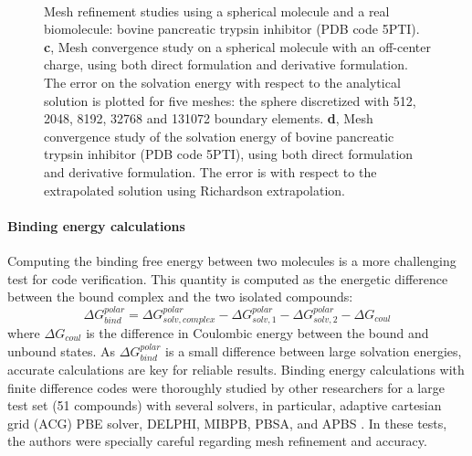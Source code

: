 \begin{figure*}
        \centering
     \quad
     \\
    \caption{Mesh refinement studies using a spherical molecule and a real biomolecule: bovine pancreatic trypsin inhibitor (PDB code 5PTI).
    \textbf{c}, Mesh convergence study on a spherical molecule with an off-center charge, using both direct formulation and derivative formulation. The error on the solvation energy with respect to the analytical solution is plotted for five meshes:
    the sphere discretized with 512, 2048, 8192, 32768 and 131072 boundary elements.
    \textbf{d}, Mesh convergence study of the solvation energy of bovine pancreatic trypsin inhibitor (PDB code 5PTI), using both direct formulation and derivative formulation.
    The error is with respect to the extrapolated solution using Richardson extrapolation.
    }
\end{figure*}

\paragraph{Binding energy calculations}

Computing the binding free energy between two molecules is a more challenging test for code verification. 
This quantity is computed as the energetic difference between the bound complex and the two isolated compounds:
%
\begin{equation} \label{eqn:bind}
\Delta G^{polar}_{bind} = \Delta G^{polar}_{solv,complex} - \Delta G^{polar}_{solv,1} - \Delta G^{polar}_{solv,2} - \Delta G_{coul} 
\end{equation}
%
where $\Delta G_{coul}$ is the difference in Coulombic energy between the bound and unbound states. 
As $\Delta G^{polar}_{bind}$ is a small difference between large solvation energies, accurate calculations are key for reliable results. 
Binding energy calculations with finite difference codes were thoroughly studied by other researchers for a large test set (51 compounds) with several solvers, in particular, adaptive cartesian grid (ACG) \cite{HarrisBoschitcshFenley2013} PBE solver, DELPHI, MIBPB, PBSA, and APBS \cite{nguyenAccurateRobustReliable2017}.
In these tests, the authors were specially careful regarding mesh refinement and accuracy.

